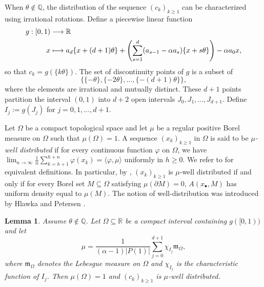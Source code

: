 \documentclass[12pt,centertags,oneside]{amsart}
\newtheorem{lemma}[theorem]{Lemma}
\theoremstyle{definition}
\newcommand{\mleb}{\mathfrak{m}}
\newcommand{\R}{\mathbb{R}}
\renewcommand{\ge}{\geqslant}
\begin{document}
When $\theta\notin \mathbb{Q}$, the distribution of the sequence 
$(c_k)_{k\geqslant 1}$ can be characterized using irrational rotations. 
Define a piecewise linear function 
\[
\aligned
g:[0,1) &\longrightarrow \mathbb{R}\\
x&
\longmapsto
a_d\{x+(d+1)\theta\}
+
\left(\sum\limits_{s=1}^{d}(a_{s-1}-\alpha a_s)\{x+s\theta\}\right)
-\alpha a_0 x,
\endaligned
\]
so that $c_k=g(\{k\theta\})$. The set of discontinuity points of $g$ is a 
subset of 
\[\bigl\{ \{-\theta\}, \{-2\theta\}, \dots, \{-(d+1)\theta\} 
\bigr\},\] 
where the elements are irrational and mutually distinct. These 
$d+1$ points partition the interval $(0, 1)$ into $d+2$ open intervals 
$J_0, J_1, \dots, J_{d+1}$. Define $I_j := g(J_j)$ for $j = 0, 1, \dots, 
d+1$. 

Let $\Omega$ be a compact topological space and let $\mu$ be a regular 
positive Borel measure on $\Omega$ such that $\mu(\Omega)=1$. A sequence 
$(x_k)_{k\ge 1}$ in $\Omega$ is said to be \emph{$\mu$-well distributed} if 
for every continuous function $\varphi$ on $\Omega$, we have $\lim_{n\to 
\infty}\frac{1}{n}\sum_{k=h+1}^{h+n}\varphi(x_k)= \langle 
\varphi,\mu\rangle$ uniformly in $h\ge 0$. We refer to \cite[Chapter~3, 
Corollaries 3.1, 3.2]{KN} for equivalent definitions. In particular, by 
\cite[Chapter~3, Corollary 3.2]{KN}, $(x_k)_{k\ge 1}$ is $\mu$-well 
distributed if and only if for every Borel set $M\subseteq \Omega$ 
satisfying $\mu(\partial M)=0$, $A(x_\bullet,M)$ has uniform density equal 
to $\mu(M)$. The notion of well-distribution was introduced by Hlawka 
\cite{Hlawka0} and Petersen \cite{Petersen}. 

\begin{lemma}\label{l:Leb}
Assume $\theta \notin \mathbb{Q}$. Let $\Omega\subseteq \R$ be a compact 
interval containing $g([0,1))$ and let 
\[\mu=\frac{1}{(\alpha-1)\lvert P(1)\rvert}\sum\limits_{j=0}^{d+1}\chi_{I_{j}} \mleb_\Omega,\]
where $\mleb_\Omega$ denotes the Lebesgue measure on $\Omega$ and 
$\chi_{I_j}$ is the characteristic function of $I_j$. Then $\mu(\Omega)=1$ 
and $(c_k)_{k\ge 1}$ is $\mu$-well distributed.
\end{lemma}
\end{document}
